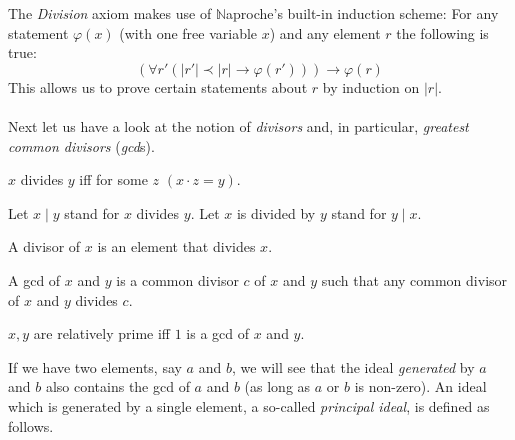 \documentclass{article}
\begin{document}
  The \textit{Division} axiom makes use of {$\mathbb{N}$aproche's} built-in
  induction scheme: For any statement $\varphi(x)$ (with one free variable $x$)
  and any element $r$ the following is true:
  \[ (\forall r' (|r'| \prec |r| \rightarrow \varphi(r'))) \rightarrow \varphi(r) \]
  This allows us to prove certain statements about $r$ by induction on $|r|$.

  \paragraph{} Next let us have a look at the notion of \textit{divisors} and,
  in particular, \textit{greatest common divisors} (\textit{gcd}s).

  \begin{forthel}

    \begin{definition}[DefDiv]
      $x$ divides $y$ iff for some $z$ $(x \cdot z = y)$.
    \end{definition}

    Let $x \mid y$ stand for $x$ divides $y$.
    Let $x$ is divided by $y$ stand for $y \mid x$.

    \begin{definition}[DefDvs]
      A divisor of $x$ is an element that divides $x$.
    \end{definition}

    \begin{definition}[DefGCD]
      A gcd of $x$ and $y$ is a common divisor $c$ of $x$ and $y$ such that any
      common divisor of $x$ and $y$ divides $c$.
    \end{definition}

    \begin{definition}[DefRel]
      $x,y$ are relatively prime iff $1$ is a gcd of $x$ and $y$.
    \end{definition}
  \end{forthel}

  If we have two elements, say $a$ and $b$, we will see that the ideal
  \textit{generated} by $a$ and $b$ also contains the gcd of $a$ and $b$ (as
  long as $a$ or $b$ is non-zero). An ideal which is generated by a single
  element, a so-called \textit{principal ideal}, is defined as follows.
\end{document}
